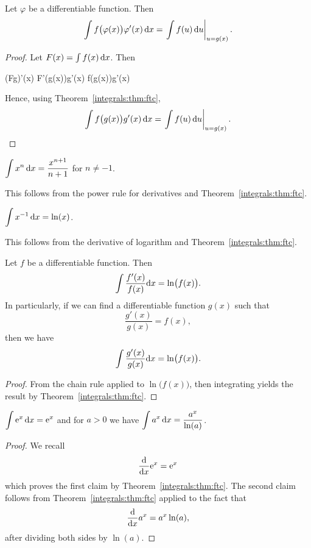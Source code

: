 \begin{corollary}\label{integrals:u-substitution}
Let $\varphi$ be a differentiable function. Then
\[ \int f\bigl(\varphi(x)\bigr)\varphi'(x)\,\mathrm{d} x = \left.\int f(u)\,\mathrm{d} u\right|_{u=g(x)}.\]
\end{corollary}

\begin{proof}
Let $F(x) = \int f(x)\,\mathrm{d} x$.
Then
\begin{calculation}
(F\circ g)'(x)
F'\bigl(g(x)\bigr)g'(x)
f\bigl(g(x)\bigr)g'(x)
\end{calculation}
Hence, using Theorem~\ref{integrals:thm:ftc},
\[ \int f\bigl(g(x)\bigr)g'(x)\,\mathrm{d} x = \left.\int f(u)\,\mathrm{d} u\right|_{u=g(x)}.\qedhere\]
\end{proof}

\label{integrals:chunk:power-rule} $\displaystyle{\int x^{n}\,\mathrm{d}x = \frac{x^{n+1}}{n+1}}$
for $n\neq-1$.

This follows from the power rule for derivatives and
Theorem~\ref{integrals:thm:ftc}.

\label{prop:integral:logarithm} $\displaystyle{\int x^{-1}\,\mathrm{d}x = \ln(x)}$.

This follows from the derivative of logarithm and
Theorem~\ref{integrals:thm:ftc}.

\begin{corollary}\label{cor:integrals:log-trick}
Let $f$ be a differentiable function. Then
\[ \int\frac{f'(x)}{f(x)}\mathrm{d} x = \ln\bigl(f(x)\bigr).\]
In particularly, if we can find a differentiable function $g(x)$ such
that
\[ \frac{g'(x)}{g(x)} = f(x),\]
then we have
\begin{equation}
\int\frac{g'(x)}{g(x)}\mathrm{d} x = \ln\bigl(f(x)\bigr).
\end{equation}
\end{corollary}

\begin{proof}
From the chain rule applied to $\ln\bigl(f(x)\bigr)$, then integrating
yields the result by Theorem~\ref{integrals:thm:ftc}.
\end{proof}

 $\displaystyle{\int \mathrm{e}^{x}\,\mathrm{d}x = \mathrm{e}^{x}}$
and for $a>0$ we have $\displaystyle{\int a^{x}\,\mathrm{d}x = \frac{a^{x}}{\ln(a)}}$.

\begin{proof}
  We recall
  \begin{equation}
\frac{\mathrm{d}}{\mathrm{d} x}\mathrm{e}^{x} = \mathrm{e}^{x}
  \end{equation}
  which proves the first claim by Theorem~\ref{integrals:thm:ftc}. The
  second claim follows from Theorem~\ref{integrals:thm:ftc} applied to
  the fact that
  \begin{equation}
\frac{\mathrm{d}}{\mathrm{d} x}a^{x} = a^{x}\ln(a),
  \end{equation}
  after dividing both sides by $\ln(a)$.
\end{proof}

